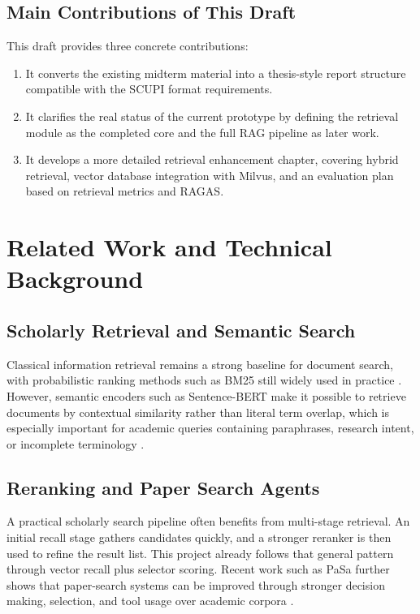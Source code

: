 \documentclass[11pt,a4paper,oneside]{report}
\begin{document}
\section{Main Contributions of This Draft}

This draft provides three concrete contributions:

\begin{enumerate}
  \item It converts the existing midterm material into a thesis-style report structure
  compatible with the SCUPI format requirements.
  \item It clarifies the real status of the current prototype by defining the retrieval
  module as the completed core and the full RAG pipeline as later work.
  \item It develops a more detailed retrieval enhancement chapter, covering hybrid
  retrieval, vector database integration with Milvus, and an evaluation plan based on
  retrieval metrics and RAGAS.
\end{enumerate}

\chapter{Related Work and Technical Background}

\section{Scholarly Retrieval and Semantic Search}

Classical information retrieval remains a strong baseline for document search, with
probabilistic ranking methods such as BM25 still widely used in practice
\cite{robertson2009}. However, semantic encoders such as Sentence-BERT make it
possible to retrieve documents by contextual similarity rather than literal term
overlap, which is especially important for academic queries containing paraphrases,
research intent, or incomplete terminology \cite{reimers2019}.

\section{Reranking and Paper Search Agents}

A practical scholarly search pipeline often benefits from multi-stage retrieval. An
initial recall stage gathers candidates quickly, and a stronger reranker is then used
to refine the result list. This project already follows that general pattern through
vector recall plus selector scoring. Recent work such as PaSa further shows that
paper-search systems can be improved through stronger decision making, selection, and
tool usage over academic corpora \cite{he2025}.
\end{document}
